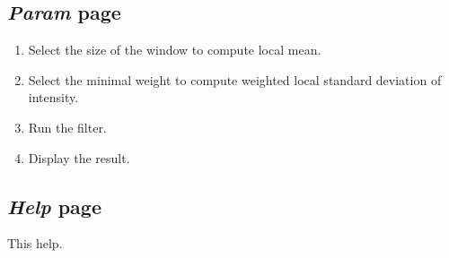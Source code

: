 \documentclass{article}
\begin{document}
\subsection{\emph{Param} page}

\begin{enumerate}
  \item Select the size of the window to compute local mean.
  \item Select the minimal weight to compute weighted local standard deviation of intensity.
  \item Run the filter.
  \item Display the result.
\end{enumerate}


\subsection{\emph{Help} page}
This help.
\end{document}
